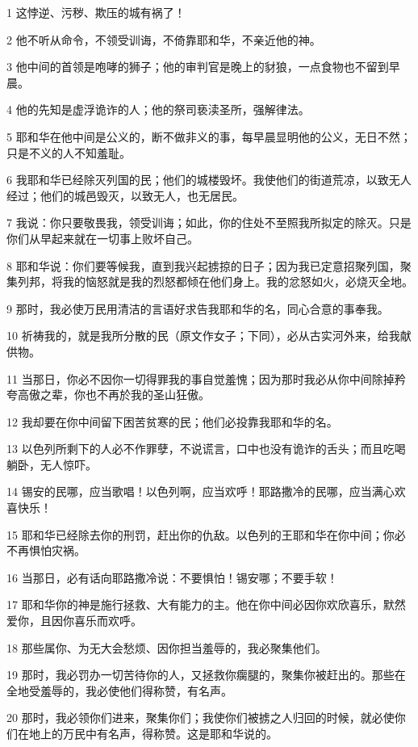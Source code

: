 \par 1 这悖逆、污秽、欺压的城有祸了！
\par 2 他不听从命令，不领受训诲，不倚靠耶和华，不亲近他的神。
\par 3 他中间的首领是咆哮的狮子；他的审判官是晚上的豺狼，一点食物也不留到早晨。
\par 4 他的先知是虚浮诡诈的人；他的祭司亵渎圣所，强解律法。
\par 5 耶和华在他中间是公义的，断不做非义的事，每早晨显明他的公义，无日不然；只是不义的人不知羞耻。
\par 6 我耶和华已经除灭列国的民；他们的城楼毁坏。我使他们的街道荒凉，以致无人经过；他们的城邑毁灭，以致无人，也无居民。
\par 7 我说：你只要敬畏我，领受训诲；如此，你的住处不至照我所拟定的除灭。只是你们从早起来就在一切事上败坏自己。
\par 8 耶和华说：你们要等候我，直到我兴起掳掠的日子；因为我已定意招聚列国，聚集列邦，将我的恼怒就是我的烈怒都倾在他们身上。我的忿怒如火，必烧灭全地。
\par 9 那时，我必使万民用清洁的言语好求告我耶和华的名，同心合意的事奉我。
\par 10 祈祷我的，就是我所分散的民（原文作女子；下同），必从古实河外来，给我献供物。
\par 11 当那日，你必不因你一切得罪我的事自觉羞愧；因为那时我必从你中间除掉矜夸高傲之辈，你也不再於我的圣山狂傲。
\par 12 我却要在你中间留下困苦贫寒的民；他们必投靠我耶和华的名。
\par 13 以色列所剩下的人必不作罪孽，不说谎言，口中也没有诡诈的舌头；而且吃喝躺卧，无人惊吓。
\par 14 锡安的民哪，应当歌唱！以色列啊，应当欢呼！耶路撒冷的民哪，应当满心欢喜快乐！
\par 15 耶和华已经除去你的刑罚，赶出你的仇敌。以色列的王耶和华在你中间；你必不再惧怕灾祸。
\par 16 当那日，必有话向耶路撒冷说：不要惧怕！锡安哪；不要手软！
\par 17 耶和华你的神是施行拯救、大有能力的主。他在你中间必因你欢欣喜乐，默然爱你，且因你喜乐而欢呼。
\par 18 那些属你、为无大会愁烦、因你担当羞辱的，我必聚集他们。
\par 19 那时，我必罚办一切苦待你的人，又拯救你瘸腿的，聚集你被赶出的。那些在全地受羞辱的，我必使他们得称赞，有名声。
\par 20 那时，我必领你们进来，聚集你们；我使你们被掳之人归回的时候，就必使你们在地上的万民中有名声，得称赞。这是耶和华说的。


